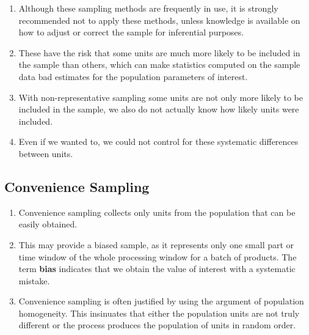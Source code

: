 \begin{enumerate}
    \item Although these sampling methods are frequently in use, it is strongly recommended not to apply these methods, unless knowledge is available on how to adjust or correct the sample for inferential purposes.
    \hfill \cite{statistics/book/Statistics-for-Data-Scientists/Maurits-Kaptein}

    \item These have the risk that some units are much more likely to be included in the sample than others, which can make statistics computed on the sample data bad estimates for the population parameters of interest.
    \hfill \cite{statistics/book/Statistics-for-Data-Scientists/Maurits-Kaptein}

    \item With non-representative sampling some units are not only more likely to be included in the sample, we also do not actually know how likely units were included. 
    \hfill \cite{statistics/book/Statistics-for-Data-Scientists/Maurits-Kaptein}

    \item Even if we wanted to, we could not control for these systematic differences between units.
    \hfill \cite{statistics/book/Statistics-for-Data-Scientists/Maurits-Kaptein}
\end{enumerate}

\subsection{Convenience Sampling \cite{statistics/book/Statistics-for-Data-Scientists/Maurits-Kaptein}}\label{Sampling Plans/Non-representative Sampling/Convenience Sampling}

\begin{enumerate}
    \item Convenience sampling collects only units from the population that can be easily obtained.
    \hfill \cite{statistics/book/Statistics-for-Data-Scientists/Maurits-Kaptein}

    \item This may provide a biased sample, as it represents only one small part or time window of the whole processing window for a batch of products. The term \textbf{bias}\label{Sampling Plans/Non-representative Sampling/Convenience Sampling/bias} indicates that we obtain the value of interest with a systematic mistake.
    \hfill \cite{statistics/book/Statistics-for-Data-Scientists/Maurits-Kaptein}

    \item  Convenience sampling is often justified by using the argument of population homogeneity. This insinuates that either the population units are not truly different or the process produces the population of units in random order. 
    \hfill \cite{statistics/book/Statistics-for-Data-Scientists/Maurits-Kaptein}
\end{enumerate}



